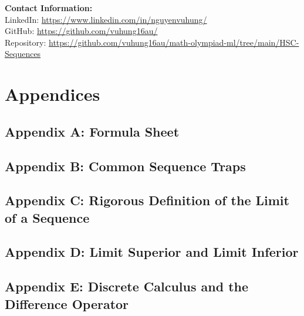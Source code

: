 \documentclass[12pt]{article}
\theoremstyle{definition}
\begin{document}
\vspace{2em}
\noindent\textbf{Contact Information:}\\[0.5em]
LinkedIn: \href{https://www.linkedin.com/in/nguyenvuhung/}{https://www.linkedin.com/in/nguyenvuhung/}\\[0.3em]
GitHub: \href{https://github.com/vuhung16au/}{https://github.com/vuhung16au/}\\[0.3em]
Repository: \href{https://github.com/vuhung16au/math-olympiad-ml/tree/main/HSC-Sequences}{https://github.com/vuhung16au/math-olympiad-ml/tree/main/HSC-Sequences}

\newpage
\section{Appendices}

\subsection{Appendix A: Formula Sheet}


\subsection{Appendix B: Common Sequence Traps}


\subsection{Appendix C: Rigorous Definition of the Limit of a Sequence}


\subsection{Appendix D: Limit Superior and Limit Inferior}


\subsection{Appendix E: Discrete Calculus and the Difference Operator}

\end{document}
